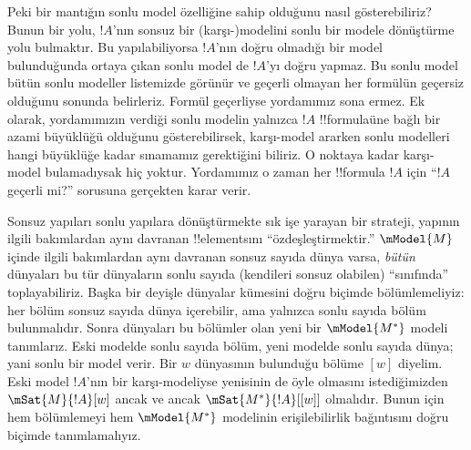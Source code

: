 \documentclass[../../../include/open-logic-section]{subfiles}
\begin{document}
Peki bir mantığın sonlu model özelliğine sahip olduğunu nasıl gösterebiliriz?
Bunun bir yolu, $!A$'nın sonsuz bir (karşı-)modelini sonlu bir modele
dönüştürme yolu bulmaktır. Bu yapılabiliyorsa $!A$'nın doğru olmadığı bir
model bulunduğunda ortaya çıkan sonlu model de $!A$'yı doğru yapmaz. Bu
sonlu model bütün sonlu modeller listemizde görünür ve geçerli olmayan her
formülün geçersiz olduğunu sonunda belirleriz. Formül geçerliyse yordamımız
sona ermez. Ek olarak, yordamımızın verdiği sonlu modelin yalnızca $!A$
!!{formula}{}üne bağlı bir azami büyüklüğü olduğunu gösterebilirsek,
karşı-model ararken sonlu modelleri hangi büyüklüğe kadar sınamamız
gerektiğini biliriz. O noktaya kadar karşı-model bulamadıysak hiç yoktur.
  Yordamımız o zaman her !!{formula} $!A$ için ``$!A$ geçerli mi?'' sorusuna
  gerçekten karar verir.

Sonsuz yapıları sonlu yapılara dönüştürmekte sık işe yarayan bir strateji,
yapının ilgili bakımlardan aynı davranan !!{element}s{}ını
``özdeşleştirmektir.'' $\mModel{M}$ içinde ilgili bakımlardan aynı davranan
sonsuz sayıda dünya varsa, \emph{bütün} dünyaları bu tür dünyaların sonlu
sayıda (kendileri sonsuz olabilen) ``sınıfında'' toplayabiliriz. Başka bir
deyişle dünyalar kümesini doğru biçimde bölümlemeliyiz: her bölüm sonsuz
sayıda dünya içerebilir, ama yalnızca sonlu sayıda bölüm bulunmalıdır. Sonra
dünyaları bu bölümler olan yeni bir $\mModel{M^*}$ modeli tanımlarız. Eski
modelde sonlu sayıda bölüm, yeni modelde sonlu sayıda dünya; yani sonlu bir
model verir. Bir $w$ dünyasının bulunduğu bölüme $[w]$ diyelim. Eski model
$!A$'nın bir karşı-modeliyse yenisinin de öyle olmasını istediğimizden
$\mSat{M}{!A}[w]$ ancak ve ancak $\mSat{M^*}{!A}[{[w]}]$ olmalıdır. Bunun
için hem bölümlemeyi hem $\mModel{M^*}$ modelinin erişilebilirlik bağıntısını
doğru biçimde tanımlamalıyız.
\end{document}
